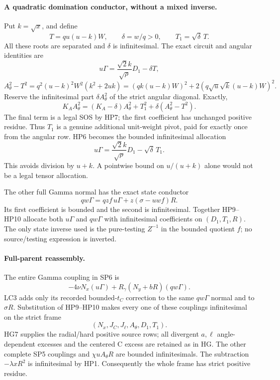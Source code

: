 \paragraph{A quadratic domination conductor, without a mixed inverse.}
Put $k=\sqrt x$, and define
\[
 T=q u(u-k)W,\qquad \delta=w/q>0,
 \qquad T_1=\sqrt\delta\,T.
\]
All these roots are separated and $\delta$ is infinitesimal.
The exact circuit and angular identities are
\[
 u\Gamma=\frac{\sqrt2 k}{\sqrt\rho}D_1-\delta T,
 \tag{HP6}
\]
\[
 A_\theta^2-T^2
   =q^2(u-k)^2W^2(k^2+2uk)
   =(qk(u-k)W)^2+2(q\sqrt u\sqrt k(u-k)W)^2.
 \tag{HP7}
\]
Reserve the infinitesimal part $\delta A_\theta^2$ of the strict
angular diagonal.  Exactly,
\[
 K_A A_\theta^2=(K_A-\delta)A_\theta^2
         +T_1^2+\delta(A_\theta^2-T^2).
 \tag{HP8}
\]
The final term is a legal SOS by HP7; the first coefficient has
unchanged positive residue.  Thus $T_1$ is a genuine additional
unit-weight pivot, paid for exactly once from the angular row.
HP6 becomes the bounded infinitesimal allocation
\[
 u\Gamma=\frac{\sqrt2 k}{\sqrt\rho}D_1
                   -\sqrt\delta\,T_1.
 \tag{HP9}
\]
This avoids division by $u+k$.  A pointwise bound on
$u/(u+k)$ alone would not be a legal tensor allocation.

The other full Gamma normal has the exact state conductor
\[
 qw\Gamma=qzf\,u\Gamma+z(\sigma-uwf)R.
 \tag{HP10}
\]
Its first coefficient is bounded and the second is infinitesimal.
Together HP9--HP10 allocate both $u\Gamma$ and $qw\Gamma$ with
infinitesimal coefficients on $(D_1,T_1,R)$.  The only state
inverse used is the pure-testing $Z^{-1}$ in the bounded quotient
$f$; no source/testing expression is inverted.

\paragraph{Full-parent reassembly.}
The entire Gamma coupling in SP6 is
\[
 -4\nu N_x(u\Gamma)+R_\gamma(N_y+bR)(qw\Gamma).
\]
LC3 adds only its recorded bounded-$t_C$ correction to the same
$qw\Gamma$ normal and to $\sigma R$.  Substitution of HP9--HP10
makes every one of these couplings infinitesimal on the strict frame
\[
 (N_x,J_C,J_\ell,A_\theta,D_1,T_1).
\]
HG7 supplies the radial/hard positive source rows; all divergent
$a,\ell$ angle-dependent excesses and the centered C excess are
retained as in HG.  The other complete SP5 couplings and
$\chi uA_\theta R$ are bounded infinitesimals.  The subtraction
$-\lambda xR^2$ is infinitesimal by HP1.  Consequently the whole
frame has strict positive residue.

